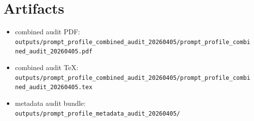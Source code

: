 \documentclass[11pt]{article}
\begin{document}
\section*{Artifacts}
\begin{itemize}[leftmargin=1.5em]
\item combined audit PDF:
  \texttt{outputs/prompt\_profile\_combined\_audit\_20260405/prompt\_profile\_combined\_audit\_20260405.pdf}
\item combined audit TeX:
  \texttt{outputs/prompt\_profile\_combined\_audit\_20260405/prompt\_profile\_combined\_audit\_20260405.tex}
\item metadata audit bundle:
  \texttt{outputs/prompt\_profile\_metadata\_audit\_20260405/}
\end{itemize}
\end{document}
